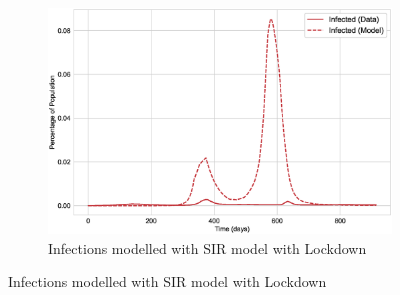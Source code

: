 \documentclass[tikz,fleqn,12pt]{wlscirep}
\begin{document}
\begin{figure}[H]\ContinuedFloat
  \begin{subfigure}[t]{\textwidth}
    \centering
    \includegraphics[scale=0.50]{images/SIR_model_with_lockdown_infections_IND.eps}
    \caption{Infections modelled with SIR model with Lockdown}
    \label{fig:SIR_model_with_lockdown_infections_IND}
  \end{subfigure}
\end{figure}
\end{document}
